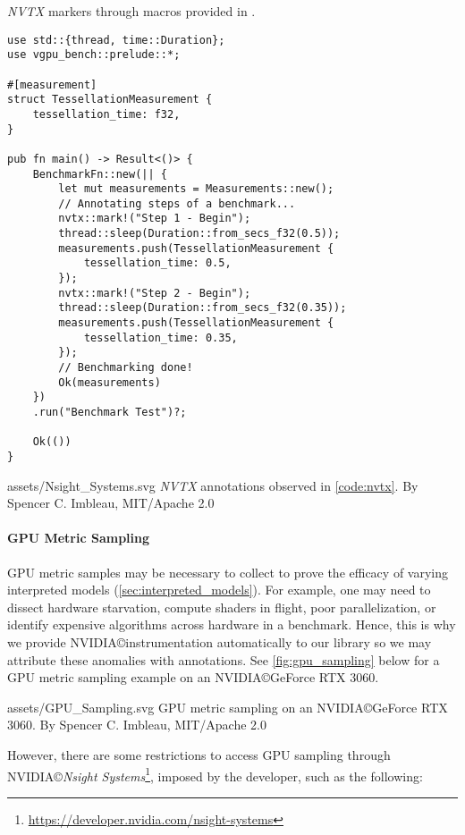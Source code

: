 \begin{snippet}
\caption{\textit{NVTX} markers through macros provided in \toollinkedname.}\label{code:nvtx}
\begin{verbatim}
use std::{thread, time::Duration};
use vgpu_bench::prelude::*;

#[measurement]
struct TessellationMeasurement {
    tessellation_time: f32,
}

pub fn main() -> Result<()> {
    BenchmarkFn::new(|| {
        let mut measurements = Measurements::new();
        // Annotating steps of a benchmark...
        nvtx::mark!("Step 1 - Begin");
        thread::sleep(Duration::from_secs_f32(0.5));
        measurements.push(TessellationMeasurement {
            tessellation_time: 0.5,
        });
        nvtx::mark!("Step 2 - Begin");
        thread::sleep(Duration::from_secs_f32(0.35));
        measurements.push(TessellationMeasurement {
            tessellation_time: 0.35,
        });
        // Benchmarking done!
        Ok(measurements)
    })
    .run("Benchmark Test")?;

    Ok(())
}
\end{verbatim}
\end{snippet}

\widesvg
{assets/Nsight_Systems.svg}
{\textit{NVTX} annotations observed in \cref{code:nvtx}.\label{fig:sampling}}
{By Spencer C. Imbleau, MIT/Apache 2.0}
\medskip

\paragraph{GPU Metric Sampling}
GPU metric samples may be necessary to collect to prove the efficacy of varying interpreted models (\cref{sec:interpreted_models}). For example, one may need to dissect hardware starvation, compute shaders in flight, poor parallelization, or identify expensive algorithms across hardware in a benchmark. Hence, this is why we provide NVIDIA\copyright instrumentation automatically to our library so we may attribute these anomalies with annotations. See \cref{fig:gpu_sampling} below for a GPU metric sampling example on an NVIDIA\copyright GeForce RTX 3060.

\widesvg
{assets/GPU_Sampling.svg}
{GPU metric sampling on an NVIDIA\copyright GeForce RTX 3060.\label{fig:gpu_sampling}}
{By Spencer C. Imbleau, MIT/Apache 2.0}
\medskip

However, there are some restrictions to access GPU sampling through NVIDIA\copyright \textit{Nsight Systems}\footnote{\href{https://developer.nvidia.com/nsight-systems}{https://developer.nvidia.com/nsight-systems}}, imposed by the developer, such as the following:

